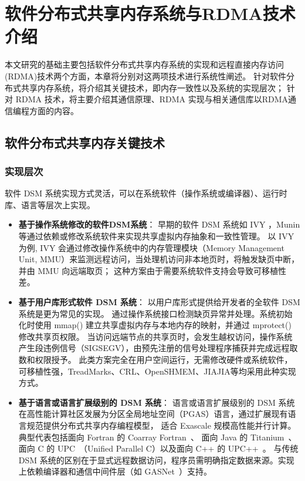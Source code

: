 \chapter{软件分布式共享内存系统与RDMA技术介绍}\label{chap:sdsm}{
    本文研究的基础主要包括软件分布式共享内存系统的实现和远程直接内存访问(RDMA)技术两个方面，本章将分别对这两项技术进行系统性阐述。
    针对软件分布式共享内存系统，将介绍其关键技术，即内存一致性以及系统的实现层次；
    针对 RDMA 技术，将主要介绍其通信原理、RDMA 实现与相关通信库以RDMA通信编程方面的内容。

    \section{软件分布式共享内存关键技术}\label{软件分布式共享内存关键技术}

    \subsection{实现层次}\label{sec:implementations}
    软件 DSM 系统实现方式灵活，可以在系统软件（操作系统或编译器）、运行时库、语言等层次上实现。
    \begin{itemize}
        \item \textbf{基于操作系统修改的软件DSM系统}：
              早期的软件 DSM 系统如 IVY\citep{likai1988ivy} ，Munin\citep{bennett1990munin}等通过依赖或修改系统软件来实现共享虚拟内存抽象和一致性管理。
              以 IVY 为例, IVY 会通过修改操作系统中的内存管理模块（Memory Management Unit, MMU）来监测远程访问，当处理机访问非本地页时，将触发缺页中断，并由 MMU 向远端取页；
              这种方案由于需要系统软件支持会导致可移植性差。

        \item \textbf{基于用户库形式软件 DSM 系统}：
              以用户库形式提供给开发者的全软件 DSM 系统是更为常见的实现。
              通过操作系统接口检测缺页异常并处理。系统初始化时使用 mmap() 建立共享虚拟内存与本地内存的映射，并通过 mprotect() 修改共享页权限。
              当访问远端节点的共享页时，会发生越权访问，操作系统产生段违例信号（SIGSEGV），由预先注册的信号处理程序捕获并完成远程取数和权限授予。
              此类方案完全在用户空间运行，无需修改硬件或系统软件，可移植性强，TreadMarks、CRL、OpenSHMEM、JIAJIA等均采用此种实现方式。

        \item \textbf{基于语言或语言扩展级别的 DSM 系统}：
              语言或语言扩展级别的 DSM 系统在高性能计算社区发展为分区全局地址空间（PGAS）语言，通过扩展现有语言规范提供分布式共享内存编程模型，
              适合 Exascale 规模高性能并行计算。典型代表包括面向 Fortran 的 Coarray Fortran~\citep{numrich1998coarrayfortran, coarryfortran2}、
              面向 Java 的 Titanium~\citep{Yelick1998Titanium}、
              面向 C 的 UPC~\citep{bonachea2013UPC}（Unified Parallel C）以及面向 C++ 的 UPC++~\citep{bachan2019upc++}。
              与传统 DSM 系统的区别在于显式远程数据访问，程序员需明确指定数据来源。实现上依赖编译器和通信中间件层（如 GASNet~\citep{Bonachea2018GASNetEX}）支持。
    \end{itemize}

}
